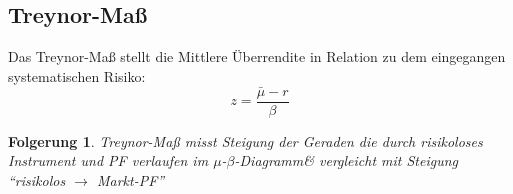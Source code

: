 \documentclass[a4paper]{article}
\theoremstyle{break}
\newcommand{\mbd}{$\mu$-$\beta$-Diagramm}
\newtheorem{der}{Folgerung}[section]
\begin{document}
\subsection{Treynor-Maß}
    Das Treynor-Maß stellt die Mittlere Überrendite in Relation zu dem eingegangen systematischen Risiko:
    $$z = \frac{\bar{\mu} - r}{\beta}$$
    \begin{der}
       Treynor-Maß misst Steigung der Geraden die durch risikoloses Instrument und PF verlaufen im \mbd \& vergleicht mit Steigung ``risikolos $\rightarrow$ Markt-PF''
    \end{der}

\end{document}
